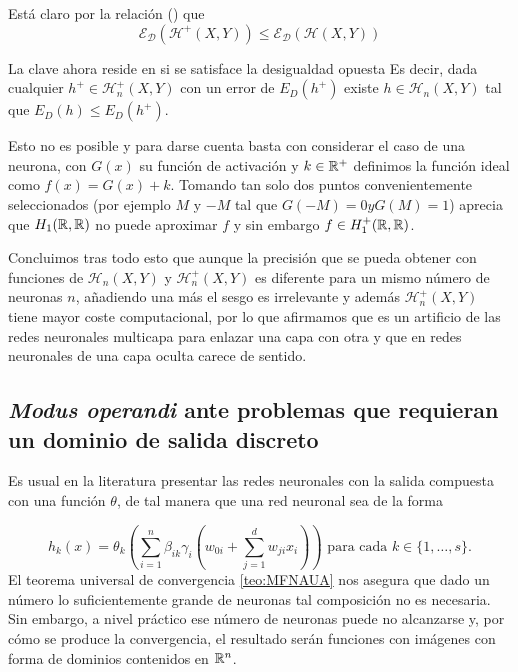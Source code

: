 \begin{aportacionOriginal}
Está claro por la relación  
 ()
 que 
 \begin{equation}
    \mathcal{E}_{\mathcal{D}}(\mathcal{H}^+(X,Y))
    \leq
    \mathcal{E}_{\mathcal{D}}(\mathcal{H}(X,Y))
 \end{equation}

 La clave ahora reside en si se satisface la desigualdad opuesta
Es decir, dada cualquier $h^+ \in \mathcal{H}^+_n(X,Y)$ con un error de $E_D(h^+)$ existe $h \in \mathcal{H}_n(X,Y)$  tal que $E_D(h) \leq E_D(h^+).$  

Esto no es posible y para darse cuenta basta con considerar el caso de una neurona, con $G(x)$ su función de activación y $k \in \mathbb{R}^+$ definimos la función ideal como $f(x) = G(x) +k$. 
Tomando tan solo dos puntos convenientemente seleccionados (por ejemplo $M$ y $-M$ tal que $G(-M) = 0 y G(M) = 1$) aprecia que $H_1(\mathbb{R}, \mathbb{R})$ no puede aproximar $f$ y sin embargo $f \in H^+_1(\mathbb{R}, \mathbb{R})$.


Concluimos tras todo esto que aunque la precisión
 que se pueda obtener con funciones de
 $\mathcal{H}_n(X,Y)$ y $\mathcal{H}^+_n(X,Y)$ es
  diferente para un mismo número de neuronas $n$,
  añadiendo una más el sesgo es irrelevante  y 
  además $\mathcal{H}^+_n(X,Y)$ tiene mayor coste
   computacional, por lo que afirmamos que 
es un artificio de las redes neuronales multicapa para enlazar una capa con otra y que en redes neuronales de una capa oculta carece de sentido.

\end{aportacionOriginal} %


\subsection{\textit{Modus operandi} ante problemas que requieran un dominio de salida discreto}

Es usual en la literatura presentar las redes neuronales con la salida compuesta con una función $\theta$, de tal manera que una red neuronal sea de la forma

\begin{equation}\label{red-neuronal-con-compuesta}
    h_k(x) = \theta_k 
    \left(
        \sum_{i=1}^{n} \beta_{i k} \gamma_{i}
    \left(
        w_{0 i} + \sum_{j=1}^d w_{j i } x_i
    \right) 
    \right)
    \text{ para cada  } k \in \{1, \ldots, s \}.
\end{equation}
El teorema universal de convergencia \ref{teo:MFNAUA} nos asegura 
que dado un número lo suficientemente grande de neuronas tal 
composición no es necesaria. Sin embargo, a nivel práctico ese 
número de neuronas puede no alcanzarse y, por cómo se produce la convergencia, el resultado serán funciones con imágenes con forma de dominios contenidos en $\mathbb{R}^n$.

